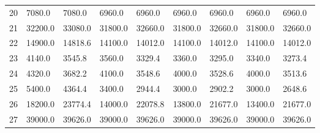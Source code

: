 \begin{tabular}{|r|l|l|l|l|l|l|l|l|}
  20 & 7080.0 & 7080.0 & 6960.0 & 6960.0 & 6960.0 & 6960.0 & 6960.0 & 6960.0 \\ 
  21 & 32200.0 & 33080.0 & 31800.0 & 32660.0 & 31800.0 & 32660.0 & 31800.0 & 32660.0 \\ 
  22 & 14900.0 & 14818.6 & 14100.0 & 14012.0 & 14100.0 & 14012.0 & 14100.0 & 14012.0 \\ 
  23 & 4140.0 & 3545.8 & 3560.0 & 3329.4 & 3360.0 & 3295.0 & 3340.0 & 3273.4 \\ 
  24 & 4320.0 & 3682.2 & 4100.0 & 3548.6 & 4000.0 & 3528.6 & 4000.0 & 3513.6 \\ 
  25 & 5400.0 & 4364.4 & 3400.0 & 2944.4 & 3000.0 & 2902.2 & 3000.0 & 2648.6 \\ 
  26 & 18200.0 & 23774.4 & 14000.0 & 22078.8 & 13800.0 & 21677.0 & 13400.0 & 21677.0 \\ 
  27 & 39000.0 & 39626.0 & 39000.0 & 39626.0 & 39000.0 & 39626.0 & 39000.0 & 39626.0 \\ 
\end{tabular}
